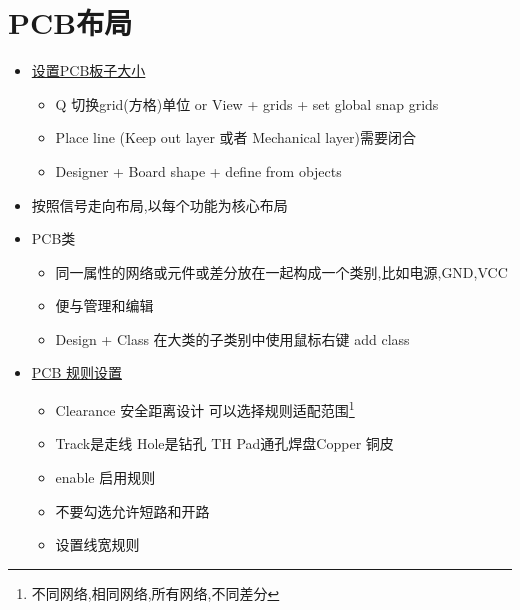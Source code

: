 \documentclass[11pt]{article}
\begin{document}
\section{PCB布局}
\label{sec:orgfde2e93}
\begin{itemize}
\item \uline{设置PCB板子大小}
\begin{itemize}
\item Q 切换grid(方格)单位 or View + grids + set global snap grids
\item Place line (Keep out layer 或者 Mechanical layer)需要闭合
\item Designer + Board shape + define from objects
\end{itemize}
\item 按照信号走向布局,以每个功能为核心布局
\item PCB类
\begin{itemize}
\item 同一属性的网络或元件或差分放在一起构成一个类别,比如电源,GND,VCC
\item 便与管理和编辑
\item Design + Class 在大类的子类别中使用鼠标右键 add class
\end{itemize}
\item \uline{PCB 规则设置}
\begin{itemize}
\item Clearance 安全距离设计 可以选择规则适配范围\footnote{不同网络,相同网络,所有网络,不同差分}
\item Track是走线 Hole是钻孔 TH Pad通孔焊盘Copper 铜皮
\item enable 启用规则
\item 不要勾选允许短路和开路
\item 设置线宽规则
\end{itemize}
\end{itemize}
\end{document}
